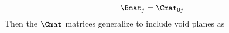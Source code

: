 \begin{equation}
  \Bmat_{j} = \Cmat_{0 j}
\end{equation}
Then the $\Cmat$ matrices generalize to include void planes as